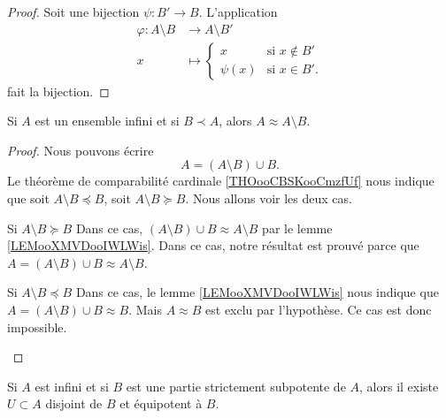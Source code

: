 \begin{proof}
    Soit une bijection \( \psi\colon B'\to B\). L'application
    \begin{equation}
        \begin{aligned}
            \varphi\colon A\setminus B&\to A\setminus B' \\
            x&\mapsto \begin{cases}
                x    &   \text{si } x\notin B'\\
                \psi(x)    &    \text{si } x\in B'.
            \end{cases}
        \end{aligned}
    \end{equation}
    fait la bijection.
\end{proof}

\begin{lemma}       \label{LEMooIVCBooHWQiZB}
    Si \( A\) est un ensemble infini et si \( B\prec A\), alors \( A\approx A\setminus B\).
\end{lemma}

\begin{proof}
    Nous pouvons écrire
    \begin{equation}
        A=(A\setminus B)\cup B.
    \end{equation}
    Le théorème de comparabilité cardinale \ref{THOooCBSKooCmzfUf} nous indique que soit \( A\setminus B\preceq B\), soit \( A\setminus B\succeq B\). Nous allons voir les deux cas.
    \begin{subproof}
        \item[Si \( A\setminus B\succeq B\)] 
            Dans ce cas, \( (A\setminus B)\cup B\approx A\setminus B\) par le lemme \ref{LEMooXMVDooIWLWis}. Dans ce cas, notre résultat est prouvé parce que \( A=(A\setminus B)\cup B\approx A\setminus B\).
        \item[Si \( A\setminus B\preceq B\)] 
            Dans ce cas, le lemme \ref{LEMooXMVDooIWLWis} nous indique que \( A=(A\setminus B)\cup B\approx B\). Mais \( A\approx B\) est exclu par l'hypothèse. Ce cas est donc impossible.
    \end{subproof}
\end{proof}

\begin{lemma}        \label{LEMooMRVQooUZSSyL}
    Si \( A\) est infini et si \( B\) est une partie strictement subpotente de \( A\), alors il existe \( U\subset A\) disjoint de \( B\) et équipotent à \( B\).
\end{lemma}

